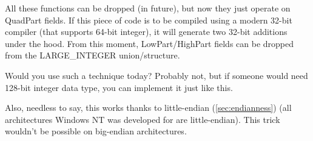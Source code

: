 All these functions can be dropped (in future), but now they just operate on QuadPart fields.
If this piece of code is to be compiled using a modern 32-bit compiler (that supports 64-bit integer),
it will generate two 32-bit additions under the hood.
From this moment, LowPart/HighPart fields can be dropped from the LARGE\_INTEGER union/structure.

Would you use such a technique today?
Probably not, but if someone would need 128-bit integer data type, you can implement it just like this.

Also, needless to say, this works thanks to little-endian (\ref{sec:endianness})
(all architectures Windows NT was developed for are little-endian).
This trick wouldn't be possible on big-endian architectures.

